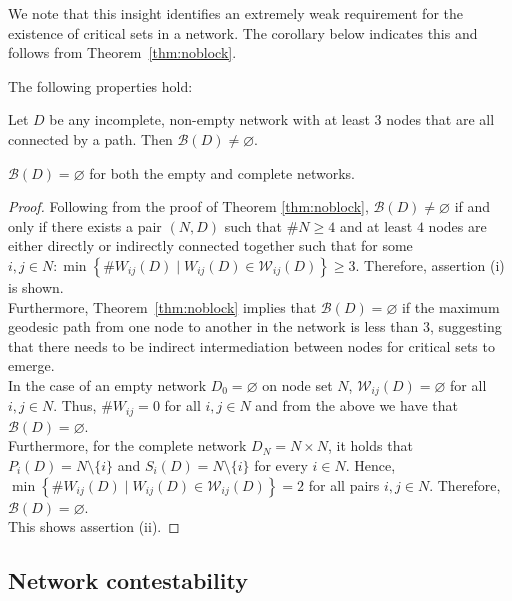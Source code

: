 \bigskip\noindent
We note that this insight identifies an extremely weak requirement for the existence of critical sets in a network. The corollary below indicates this and follows from Theorem~\ref{thm:noblock}.
\begin{corollary}
The following properties hold:
\begin{numm}
\item Let $D$ be any incomplete, non-empty network with at least $3$ nodes that are all connected by a path. Then $\mathcal{B} (D) \neq \varnothing$.

\item $\mathcal{B} (D) = \varnothing$ for both the empty and complete networks.
\end{numm}
\end{corollary}
\begin{proof}
Following from the proof of Theorem \ref{thm:noblock}, $\mathcal{B}(D) \neq \varnothing$ if and only if there exists a pair $(N,D)$ such that $\# N \geqslant 4$ and at least $4$ nodes are either directly or indirectly connected together such that for some $i,j \in N \colon \min \left\{ \# W_{ij}(D) \mid W_{ij}(D) \in \mathcal{W}_{ij}(D) \right\} \geqslant 3$. Therefore, assertion (i) is shown.
\\[1ex]
Furthermore, Theorem~\ref{thm:noblock} implies that $\mathcal{B} (D) = \varnothing$ if the maximum geodesic path from one node to another in the network is less than $3$, suggesting that there needs to be indirect intermediation between nodes for critical sets to emerge.
\\
In the case of an empty network $D_0 = \varnothing$ on node set $N$, $\mathcal{W}_{ij}(D) = \varnothing$ for all $i,j \in N$. Thus, $\# W_{ij} = 0$ for all $i,j \in N$ and from the above we have that $\mathcal{B} (D) = \varnothing$.
\\
Furthermore, for the complete network $D_N = N \times N$, it holds that $P_{i}(D) = N \setminus \{i\}$ and $S_{i}(D) = N \setminus \{i\}$ for every $i \in N$. Hence, $\min \left\{ \# W_{ij}(D) \mid W_{ij}(D) \in \mathcal{W}_{ij}(D) \right\} = 2$ for all pairs $i,j \in N$. Therefore, $\mathcal{B} (D) = \varnothing$.
\\
This shows assertion (ii).
\end{proof}

\subsection{Network contestability}

